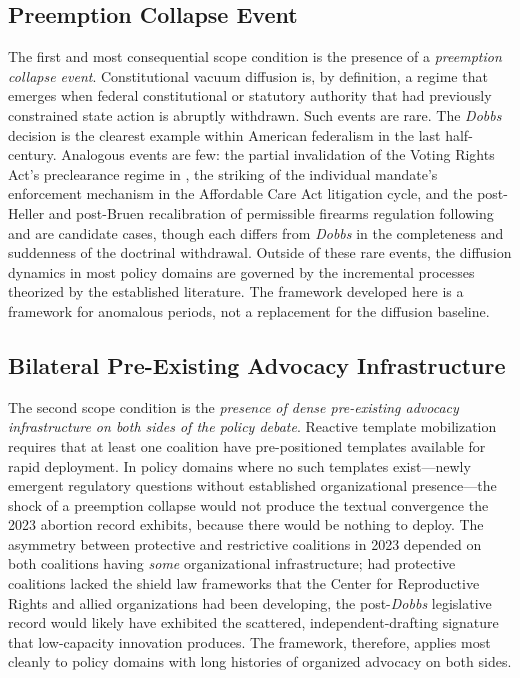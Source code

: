 \subsection{Preemption Collapse Event}
The first and most consequential scope condition is the presence of a \emph{preemption collapse event}. Constitutional vacuum diffusion is, by definition, a regime that emerges when federal constitutional or statutory authority that had previously constrained state action is abruptly withdrawn. Such events are rare. The \textit{Dobbs} decision is the clearest example within American federalism in the last half-century. Analogous events are few: the partial invalidation of the Voting Rights Act's preclearance regime in \textcite{ShelbyCountyAla2013}, the striking of the individual mandate's enforcement mechanism in the Affordable Care Act litigation cycle, and the post-Heller and post-Bruen recalibration of permissible firearms regulation following \textcite{ussc2008heller} and \textcite{nyrifle2022bruen} are candidate cases, though each differs from \textit{Dobbs} in the completeness and suddenness of the doctrinal withdrawal. Outside of these rare events, the diffusion dynamics in most policy domains are governed by the incremental processes theorized by the established literature. The framework developed here is a framework for anomalous periods, not a replacement for the diffusion baseline.
 
\subsection{Bilateral Pre-Existing Advocacy Infrastructure}
The second scope condition is the \emph{presence of dense pre-existing advocacy infrastructure on both sides of the policy debate}. Reactive template mobilization requires that at least one coalition have pre-positioned templates available for rapid deployment. In policy domains where no such templates exist---newly emergent regulatory questions without established organizational presence---the shock of a preemption collapse would not produce the textual convergence the 2023 abortion record exhibits, because there would be nothing to deploy. The asymmetry between protective and restrictive coalitions in 2023 depended on both coalitions having \emph{some} organizational infrastructure; had protective coalitions lacked the shield law frameworks that the Center for Reproductive Rights and allied organizations had been developing, the post-\textit{Dobbs} legislative record would likely have exhibited the scattered, independent-drafting signature that low-capacity innovation produces. The framework, therefore, applies most cleanly to policy domains with long histories of organized advocacy on both sides.
 
